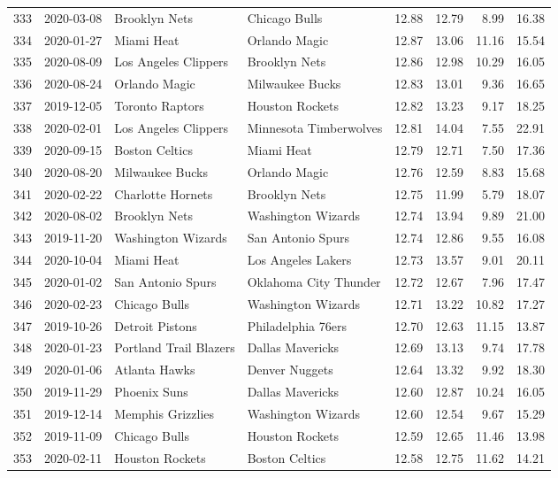 \documentclass[
  11pt,
]{article}
\theoremstyle{nonumberplain}
\begin{document}
\begin{longtable}{rl|llr|rrr}
333 & 2020-03-08 & Brooklyn Nets & Chicago Bulls & 12.88 & 12.79 & 8.99 & 16.38\\
334 & 2020-01-27 & Miami Heat & Orlando Magic & 12.87 & 13.06 & 11.16 & 15.54\\
335 & 2020-08-09 & Los Angeles Clippers & Brooklyn Nets & 12.86 & 12.98 & 10.29 & 16.05\\
336 & 2020-08-24 & Orlando Magic & Milwaukee Bucks & 12.83 & 13.01 & 9.36 & 16.65\\
337 & 2019-12-05 & Toronto Raptors & Houston Rockets & 12.82 & 13.23 & 9.17 & 18.25\\
338 & 2020-02-01 & Los Angeles Clippers & Minnesota Timberwolves & 12.81 & 14.04 & 7.55 & 22.91\\
339 & 2020-09-15 & Boston Celtics & Miami Heat & 12.79 & 12.71 & 7.50 & 17.36\\
340 & 2020-08-20 & Milwaukee Bucks & Orlando Magic & 12.76 & 12.59 & 8.83 & 15.68\\
341 & 2020-02-22 & Charlotte Hornets & Brooklyn Nets & 12.75 & 11.99 & 5.79 & 18.07\\
342 & 2020-08-02 & Brooklyn Nets & Washington Wizards & 12.74 & 13.94 & 9.89 & 21.00\\
343 & 2019-11-20 & Washington Wizards & San Antonio Spurs & 12.74 & 12.86 & 9.55 & 16.08\\
344 & 2020-10-04 & Miami Heat & Los Angeles Lakers & 12.73 & 13.57 & 9.01 & 20.11\\
345 & 2020-01-02 & San Antonio Spurs & Oklahoma City Thunder & 12.72 & 12.67 & 7.96 & 17.47\\
346 & 2020-02-23 & Chicago Bulls & Washington Wizards & 12.71 & 13.22 & 10.82 & 17.27\\
347 & 2019-10-26 & Detroit Pistons & Philadelphia 76ers & 12.70 & 12.63 & 11.15 & 13.87\\
348 & 2020-01-23 & Portland Trail Blazers & Dallas Mavericks & 12.69 & 13.13 & 9.74 & 17.78\\
349 & 2020-01-06 & Atlanta Hawks & Denver Nuggets & 12.64 & 13.32 & 9.92 & 18.30\\
350 & 2019-11-29 & Phoenix Suns & Dallas Mavericks & 12.60 & 12.87 & 10.24 & 16.05\\
351 & 2019-12-14 & Memphis Grizzlies & Washington Wizards & 12.60 & 12.54 & 9.67 & 15.29\\
352 & 2019-11-09 & Chicago Bulls & Houston Rockets & 12.59 & 12.65 & 11.46 & 13.98\\
353 & 2020-02-11 & Houston Rockets & Boston Celtics & 12.58 & 12.75 & 11.62 & 14.21\\

\end{longtable}
\end{document}
